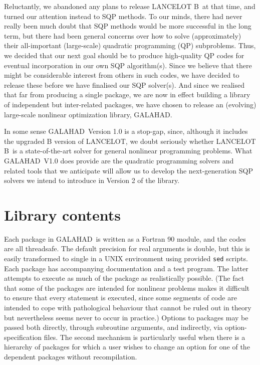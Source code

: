 \documentclass[acmtocl,acmnow]{acmtrans2m}
\newcommand{\gal}{{\sf GALAHAD}}
\newcommand{\lan}{{\sf LANCELOT}}
\newcommand{\lanb}{{\sf LANCELOT B}}
\newcommand{\resetcounters}{\setcounter{equation}{0} \setcounter{figure}{0}
 \setcounter{table}{0}}
\newcommand{\lsection}[1]{\section{#1} \resetcounters \label{#1}}
\begin{document}
Reluctantly, we abandoned any plans to release \lanb\ at that time, and turned
our attention instead to SQP methods. To our minds, there had never
really been much doubt that SQP methods would be more successful in the
long term, but there had been  general concerns over
how to solve (approximately) their all-important (large-scale) quadratic
programming (QP) subproblems. Thus, we decided that our next goal
should be to produce high-quality QP codes for eventual incorporation
in our own SQP algorithm(s). Since we believe that there might
be considerable interest from others in such codes, we have decided to release
these before we have finalised our SQP solver(s). And since we realised that
far from producing a single package, we are now in effect building a
library of independent but inter-related packages, we have chosen to
release an (evolving) large-scale nonlinear optimization library, \gal.

In some sense \gal\ Version 1.0 is a stop-gap, since, although
it includes the upgraded B version of \lan, we doubt seriously whether
\lanb\ is a state-of-the-art solver for general nonlinear programming
problems. What \gal\ V1.0 does provide are the quadratic programming solvers
and related tools that we anticipate will allow us to develop the
next-generation SQP solvers
we intend to introduce in Version 2 of the library.


\lsection{Library contents}

Each package in \gal\ is written as a Fortran 90 module, and the codes
are all threadsafe. The default
precision for real arguments is double, but this is easily transformed
to single in a UNIX environment using provided {\tt sed} scripts.
Each package has accompanying
documentation and a test program. The latter attempts to execute as
much of the package as
realistically possible. (The fact that some of the packages are
intended for nonlinear problems makes it difficult to ensure that
every statement is executed, since some segments of code are
intended to cope with pathological behaviour that cannot be ruled out
in theory but nevertheless seems never to occur in practice.)
Options to packages may be passed both directly, through subroutine arguments,
and indirectly, via option-specification files. The second mechanism is
particularly useful when there is a hierarchy of packages for which
a user wishes to change an option for one of the dependent packages without
recompilation.
\end{document}
